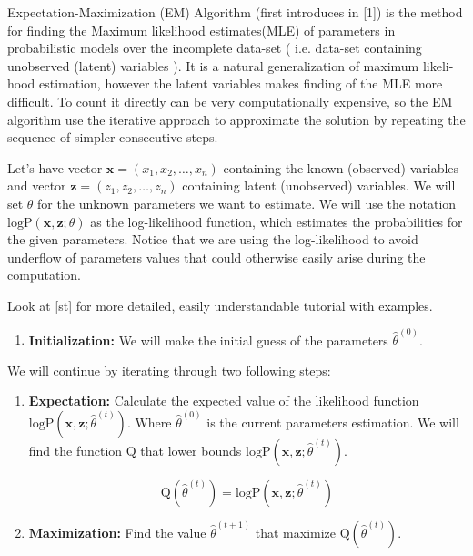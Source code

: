 \documentclass[thesis=M,english]{FITthesis}[2012/10/20]
\begin{document}
Expectation-Maximization (EM) Algorithm (first introduces in [1]) is the method for finding the Maximum likelihood estimates(MLE) of parameters in probabilistic models over the incomplete data-set ( i.e. data-set containing unobserved (latent) variables ). It is a natural generalization of maximum likeli-
hood estimation, however the latent variables makes finding of the MLE more difficult. To count it directly can be very computationally expensive, so the EM algorithm use the iterative approach to approximate the solution by repeating the sequence of simpler consecutive steps.

Let's have vector $\mathbf{x} = (x_{1},x_{2},\dotsc,x_{n})$ containing the known (observed) variables and vector $\mathbf{z} = (z_{1},z_{2},\dotsc,z_{n})$ containing latent (unobserved) variables. We will set $\theta$ for the unknown parameters we want to estimate. We will use the notation $\mathrm{logP}(\mathbf{x},\mathbf{z};\theta)$ as the log-likelihood function, which estimates the probabilities for the given parameters. Notice that we are using the log-likelihood to avoid underflow of parameters values that could otherwise easily arise during the computation.  

Look at [st] for more detailed, easily understandable tutorial with examples.    

\begin{enumerate}
\item \textbf{Initialization:} We will make the initial guess of the parameters $\hat \theta^{(0)} $.
\end{enumerate} 

We will continue by iterating through two following steps: 

\begin{enumerate}[resume]
\item \textbf{Expectation:} Calculate the expected value of the likelihood function $\mathrm{logP}(\mathbf{x},\mathbf{z};\hat \theta^{(t)})$. Where $\hat \theta^{(0)}$ is the current parameters estimation. We will find the function $\mathrm{Q}$ that lower bounds $\mathrm{logP}(\mathbf{x},\mathbf{z};\hat \theta^{(t)})$.

\begin{equation}\label{eq:exp}
 \mathrm{Q}(\hat\theta^{(t)}) =  \mathrm{logP}(\mathbf{x},\mathbf{z};\hat \theta^{(t)})
\end{equation}

\item \textbf{Maximization:} Find the value $\hat\theta^{(t+1)}$ that maximize $\mathrm{Q}(\hat\theta^{(t)})$.  
\end{enumerate}  
\end{document}
